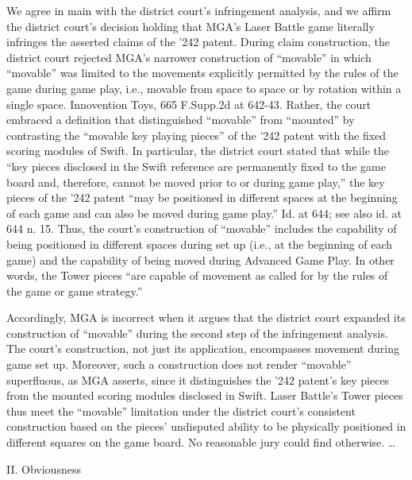 We agree in main with the district court's infringement
analysis,\textsuperscript{ }and we affirm the district court's decision holding
that MGA's Laser Battle game literally infringes the asserted claims of the
'242 patent. During claim construction, the district court rejected MGA's
narrower construction of ``movable'' in which ``movable'' was limited to the
movements explicitly permitted by the rules of the game during game play, i.e.,
movable from space to space or by rotation within a single space. Innovention
Toys, 665 F.Supp.2d at 642-43. Rather, the court embraced a definition that
distinguished ``movable'' from ``mounted'' by contrasting the ``movable key
playing pieces'' of the '242 patent with the fixed scoring modules of Swift. In
particular, the district court stated that while the ``key pieces disclosed in
the Swift reference are permanently fixed to the game board and, therefore,
cannot be moved prior to or during game play,'' the key pieces of the '242
patent ``may be positioned in different spaces at the beginning of each game
and can also be moved during game play.'' Id. at 644; see also id. at 644 n.
15. Thus, the court's construction of ``movable'' includes the capability of
being positioned in different spaces during set up (i.e., at the beginning of
each game) and the capability of being moved during Advanced Game Play. In
other words, the Tower pieces ``are capable of movement as called for by the
rules of the game or game strategy.''

Accordingly, MGA is incorrect when it argues that the district court expanded
its construction of ``movable'' during the second step of the infringement
analysis. The court's construction, not just its application, encompasses
movement during game set up. Moreover, such a construction does not render
``movable'' superfluous, as MGA asserts, since it distinguishes the '242
patent's key pieces from the mounted scoring modules disclosed in Swift. Laser
Battle's Tower pieces thus meet the ``movable'' limitation under the district
court's consistent construction based on the pieces' undisputed ability to be
physically positioned in different squares on the game board. No reasonable
jury could find otherwise. {\dots}

{\centering
II. Obviousness
\par}

